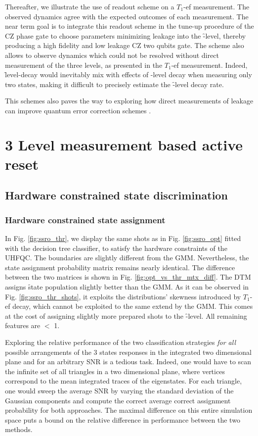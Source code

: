 Thereafter, we illustrate the use of readout scheme on  a $T_1$-ef measurement. The observed dynamics agree with the expected outcomes of each measurement. 
The near term goal is to integrate this readout scheme in the tune-up procedure of the CZ phase gate to choose parameters minimizing leakage into the \f-level, thereby producing a high fidelity and low leakage CZ two qubits gate. The scheme also allows to observe dynamics which could not be resolved without direct measurement of the three levels, as presented in the $T_1$-ef measurement. Indeed, \f level-decay  would inevitably mix with effects of \e-level decay when measuring only two states, making it difficult to precisely estimate the \f-level decay rate. 

This schemes also paves the way to exploring how direct measurements of leakage can improve quantum error correction schemes \cite{Bultink2019}.
\section{3 Level measurement based active reset} \label{sec:active_reset}

\subsection{Hardware constrained state discrimination}
\subsubsection{Hardware constrained state assignment} \label{s:experimental_data_hw_constrained}

In Fig. \ref{fig:ssro_thr}, we display the same shots as in Fig. \ref{fig:ssro_opt} fitted with the decision tree classifier, to satisfy the hardware constraints of the UHFQC. The boundaries are slightly different from the GMM. Nevertheless, the state assignment probability matrix remains nearly identical. The difference between the two matrices is shown in Fig. \ref{fig:opt_vs_thr_mtx_diff}. The DTM assigns \f state population slightly better than the GMM. As it can be observed in Fig. \ref{fig:ssro_thr_shots}, it exploits the distributions' skewness introduced by $T_1$-ef decay, which cannot be exploited to the same extend by the GMM. This comes at the cost of assigning slightly more \e prepared shots to the \f-level. All remaining features are $<$ 1\textperthousand.

Exploring the relative performance of the two classification strategies \textit{for all} possible arrangements of the 3 states responses in the integrated two dimensional plane and for an arbitrary SNR is a tedious task. Indeed, one would have to scan the infinite set of all triangles in a two dimensional plane, where vertices correspond to the mean integrated traces of the eigenstates. For each triangle, one would sweep the average SNR by varying the standard deviation of the Gaussian components and compute the correct average correct assignment probability for both approaches. The maximal difference on this entire simulation space puts a bound on the relative difference in performance between the two methods. 

